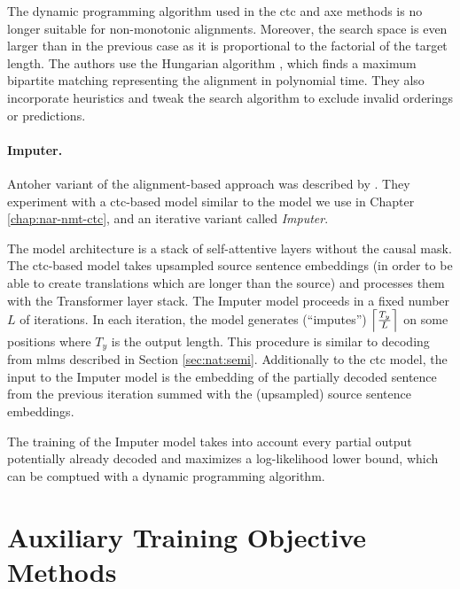 The dynamic programming algorithm used in the \ac{ctc} and \ac{axe} methods is
no longer suitable for non-monotonic alignments. Moreover, the search space is
even larger than in the previous case as it is proportional to the factorial of
the target length. The authors use the Hungarian algorithm
\citep{kuhn1955hungarian}, which finds a maximum bipartite matching
representing the alignment in polynomial time. They also incorporate heuristics
and tweak the search algorithm to exclude invalid orderings or predictions.

\paragraph{Imputer.} Antoher variant of the alignment-based approach was
described by \citet{saharia-etal-2020-non}. They experiment with a
\acs{ctc}-based model similar to the model we use in Chapter
\ref{chap:nar-nmt-ctc}, and an iterative variant called \emph{Imputer}.

The model architecture is a stack of self-attentive layers without the causal
mask. The \acs{ctc}-based model takes upsampled source sentence embeddings (in
order to be able to create translations which are longer than the source) and
processes them with the Transformer layer stack.  The Imputer model proceeds in
a fixed number $L$ of iterations. In each iteration, the model generates
(``imputes'') $\ceil*{\frac{T_y}{L}}$ on some positions where $T_y$ is the
output length. This procedure is similar to decoding from \aclp{mlm} described
in Section \ref{sec:nat:semi}. Additionally to the \ac{ctc} model, the input to
the Imputer model is the embedding of the partially decoded sentence from the
previous iteration summed with the (upsampled) source sentence embeddings.

The training of the Imputer model takes into account every partial output
potentially already decoded and maximizes a log-likelihood lower bound, which
can be comptued with a dynamic programming algorithm. 

\section{Auxiliary Training Objective Methods}%
\label{sec:nat:aux}

